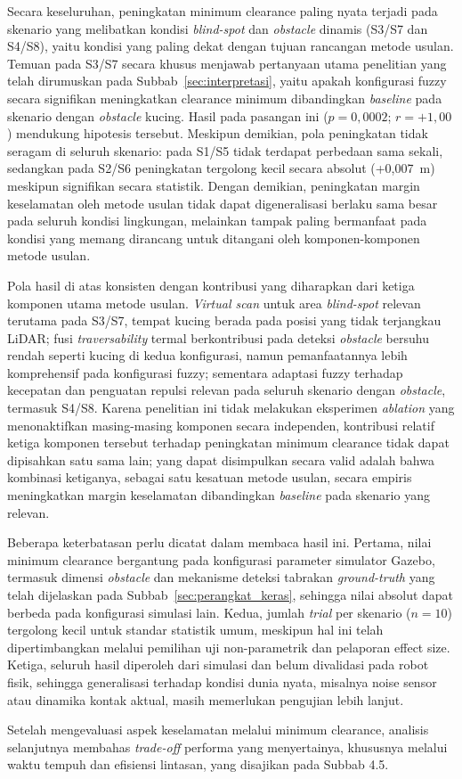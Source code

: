 Secara keseluruhan, peningkatan minimum clearance paling nyata terjadi pada
skenario yang melibatkan kondisi \textit{blind-spot} dan \textit{obstacle}
dinamis (S3/S7 dan S4/S8), yaitu kondisi yang paling dekat dengan tujuan
rancangan metode usulan. Temuan pada S3/S7 secara khusus menjawab
pertanyaan utama penelitian yang telah dirumuskan pada
Subbab~\ref{sec:interpretasi}, yaitu apakah konfigurasi fuzzy secara
signifikan meningkatkan clearance minimum dibandingkan \textit{baseline}
pada skenario dengan \textit{obstacle} kucing. Hasil pada pasangan ini
($p=0,0002$; $r=+1,00$) mendukung hipotesis tersebut. Meskipun demikian,
pola peningkatan tidak seragam di seluruh skenario: pada S1/S5 tidak
terdapat perbedaan sama sekali, sedangkan pada S2/S6 peningkatan tergolong
kecil secara absolut (+0,007~m) meskipun signifikan secara statistik.
Dengan demikian, peningkatan margin keselamatan oleh metode usulan tidak
dapat digeneralisasi berlaku sama besar pada seluruh kondisi lingkungan,
melainkan tampak paling bermanfaat pada kondisi yang memang dirancang untuk
ditangani oleh komponen-komponen metode usulan.

Pola hasil di atas konsisten dengan kontribusi yang diharapkan dari ketiga
komponen utama metode usulan. \textit{Virtual scan} untuk area
\textit{blind-spot} relevan terutama pada S3/S7, tempat kucing berada pada
posisi yang tidak terjangkau LiDAR; fusi \textit{traversability} termal
berkontribusi pada deteksi \textit{obstacle} bersuhu rendah seperti kucing
di kedua konfigurasi, namun pemanfaatannya lebih komprehensif pada
konfigurasi fuzzy; sementara adaptasi fuzzy terhadap kecepatan dan
penguatan repulsi relevan pada seluruh skenario dengan \textit{obstacle},
termasuk S4/S8. Karena penelitian ini tidak melakukan eksperimen
\textit{ablation} yang menonaktifkan masing-masing komponen secara
independen, kontribusi relatif ketiga komponen tersebut terhadap
peningkatan minimum clearance tidak dapat dipisahkan satu sama lain; yang
dapat disimpulkan secara valid adalah bahwa kombinasi ketiganya, sebagai
satu kesatuan metode usulan, secara empiris meningkatkan margin keselamatan
dibandingkan \textit{baseline} pada skenario yang relevan.

Beberapa keterbatasan perlu dicatat dalam membaca hasil ini. Pertama, nilai
minimum clearance bergantung pada konfigurasi parameter simulator Gazebo,
termasuk dimensi \textit{obstacle} dan mekanisme deteksi tabrakan
\textit{ground-truth} yang telah dijelaskan pada
Subbab~\ref{sec:perangkat_keras}, sehingga nilai absolut dapat berbeda pada
konfigurasi simulasi lain. Kedua, jumlah \textit{trial} per skenario
($n=10$) tergolong kecil untuk standar statistik umum, meskipun hal ini
telah dipertimbangkan melalui pemilihan uji non-parametrik dan pelaporan
effect size. Ketiga, seluruh hasil diperoleh dari simulasi dan belum
divalidasi pada robot fisik, sehingga generalisasi terhadap kondisi dunia
nyata, misalnya noise sensor atau dinamika kontak aktual, masih memerlukan
pengujian lebih lanjut.

Setelah mengevaluasi aspek keselamatan melalui minimum clearance, analisis
selanjutnya membahas \textit{trade-off} performa yang menyertainya, khususnya
melalui waktu tempuh dan efisiensi lintasan, yang disajikan pada Subbab 4.5.